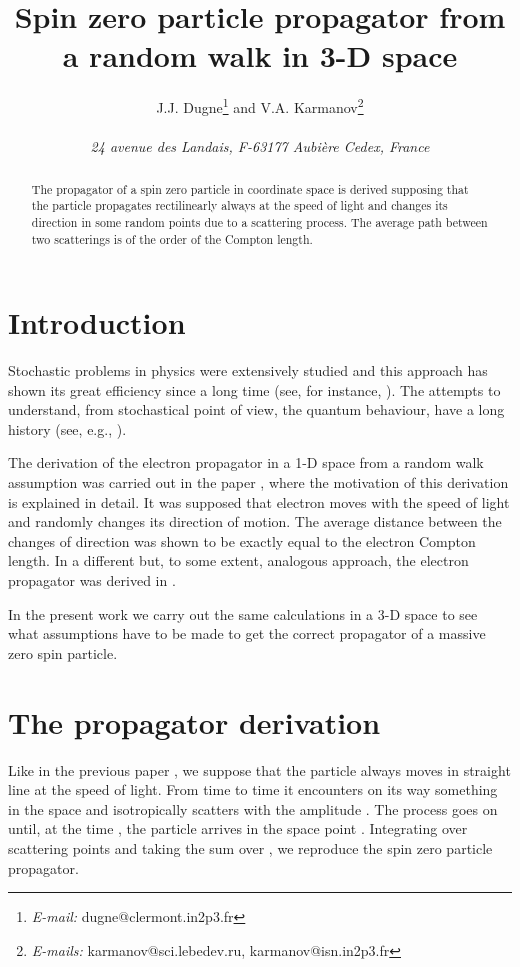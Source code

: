 \documentclass[a4paper,12pt]{article}
\title{\bf Spin zero particle propagator from a random walk in 3-D space}
\author{J.J. Dugne\myHighlight{$^{a,}$}\coordHE{}\thanks{\textit{E-mail:} dugne@clermont.in2p3.fr}
\quad and \quad
V.A. Karmanov\myHighlight{$^{b,}$}\coordHE{}\thanks{\textit{E-mails:} karmanov@sci.lebedev.ru,
karmanov@isn.in2p3.fr}\\
\myHighlight{$^a$}\coordHE{}{\small \em Laboratoire de Physique Corpusculaire,
Universit\'e Blaise-Pascal, CNRS/IN2P3}
\\{\small \em 24 avenue des Landais, F-63177 Aubi\`ere Cedex, France}\\
\myHighlight{$^b$}\coordHE{}{\small \em Lebedev Physical Institute, Leninsky Prospekt 53, 119991
Moscow, Russia}}
\date{}
\begin{document}

\maketitle
\begin{abstract}
The  propagator of a spin zero particle in coordinate space is
derived supposing that the
particle propagates rectilinearly always at the speed of light and  changes its
direction in some random points due to a  scattering process. The
average path between two scatterings  is of the order of
the Compton length.
\end{abstract}





\section{Introduction}
Stochastic  problems in physics were extensively studied and this
approach has shown its great efficiency since a long time (see,
for instance, \cite{Chandrasekhar}). The attempts to understand,
from stochastical point of view, the quantum behaviour, have a
long history (see, e.g., \cite{Bohm52,Nelson84}).

The derivation of the  electron propagator in a 1-D space from a
random walk  assumption was carried out in the paper
\cite{Karmanov93}, where the motivation of this derivation is
explained in detail. It was supposed that electron moves with the
speed of light and randomly changes its direction of motion. The
average distance between the changes of direction was shown to be
exactly equal to the electron Compton length.  In a different but,
to some extent, analogous  approach, the electron propagator was
derived in  \cite{Riazanov58}.

In the present work we carry out the same calculations in a 3-D
space to see what assumptions have to be made to get  the correct
propagator of a massive zero spin particle.

\section{The propagator derivation}\label{prop}
Like  in the previous paper \cite{Karmanov93}, we suppose that the
particle  always moves in straight line at the speed of light.
 From time to time it encounters on its way something in the space  and
isotropically scatters with the amplitude \coordHE{}.  The process goes on until, at
the time \coordHE{}, the particle arrives in the space point \coordHE{}. Integrating
over \coordHE{}  scattering points and taking the sum over \coordHE{}, we reproduce the spin
zero particle propagator.
\end{document}
